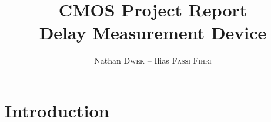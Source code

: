
\title{CMOS Project Report\\Delay Measurement Device}
\author{Nathan \textsc{Dwek} -- Ilias \textsc{Fassi Fihri}}


\maketitle
\tableofcontents
\clearpage
\hypersetup{allcolors=link}
\section{Introduction}



